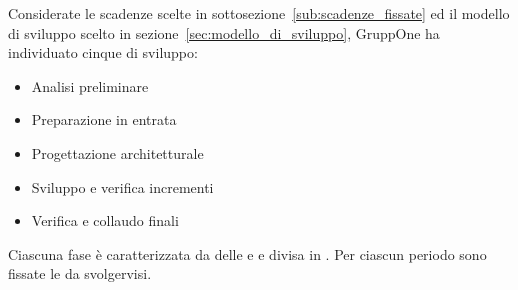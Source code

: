 \documentclass[../piano-di-progetto.tex]{subfiles}
\begin{document}
Considerate le scadenze scelte in sottosezione~\ref{sub:scadenze_fissate} ed il modello di sviluppo scelto in sezione~\ref{sec:modello_di_sviluppo}, GruppOne ha individuato cinque  di sviluppo:
\begin{itemize}
  \item Analisi preliminare
  \item Preparazione in entrata
  \item Progettazione architetturale
  \item Sviluppo e verifica incrementi
  \item Verifica e collaudo finali
\end{itemize}
Ciascuna fase è caratterizzata da delle  e  e divisa in .
Per ciascun periodo sono fissate le  da svolgervisi.
\end{document}
